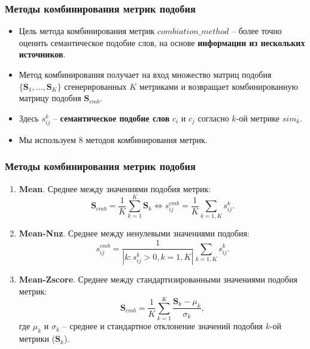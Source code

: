 \documentclass{beamer}
\begin{document}
\begin{frame}
\frametitle{Методы комбинирования метрик подобия}
\begin{itemize}
\item Цель метода комбинирования метрик $combiation\_method$ -- более точно оценить семантическое подобие слов, на основе \textbf{информации из нескольких источников}.  

\item Метод комбинирования получает на вход множество матриц подобия $\{\mathbf{S}_1,\ldots,\mathbf{S}_K\}$ сгенерированных $K$ метриками и возвращает комбинированную матрицу подобия $\mathbf{S}_{cmb}$. 

\item Здесь  $s_{ij}^k$ -- \textbf{семантическое подобие слов} $c_i$ и $c_j$ согласно $k$-ой метрике $sim_k$. 

\item Мы используем 8 методов комбинирования метрик.

\end{itemize}
\end{frame}

\begin{frame}
\frametitle{Методы комбинирования метрик подобия}

\begin{enumerate}
  
\item \textbf{Mean}. Среднее  между значениями подобия метрик:
$$\mathbf{S}_{cmb} = \frac{1}{K} \sum_{k=1}^K \mathbf{S}_k \Leftrightarrow 
s_{ij}^{cmb}= \frac{1}{K}\sum_{k=1,K} s_{ij}^k.$$

\item \textbf{Mean-Nnz}. Среднее между ненулевыми значениями подобия: $$s_{ij}^{cmb}= \frac{1}{|k:s_{ij}^k
>0,k=1,K|}\sum_{k=1,K} s_{ij}^k.$$

\item \textbf{Mean-Zscore}. Среднее  между стандартизированными значениями подобия метрик:
$$\mathbf{S}_{cmb} = \frac{1}{K} \sum_{k=1}^K \frac{\mathbf{S}_k -
\mu_k}{\sigma_k},$$ где $\mu_k$ и $\sigma_k$ -- среднее и стандартное отклонение значений подобия $k$-ой метрики ($\mathbf{S}_k$).

\end{enumerate}
\end{frame}
\end{document}
